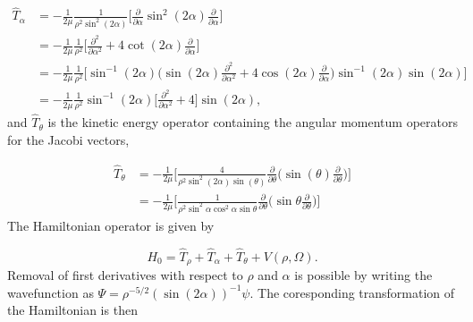 \documentclass{article}
\numberwithin{equation}{section}
\numberwithin{figure}{section}
\begin{document}
\begin{align}
\hat{T}_{\alpha} &= -\frac{1}{2\mu}  \frac{1}{\rho^2 \sin^2(2\alpha)}  \bigg[ \frac{\partial}{\partial\alpha} \sin^2(2\alpha) \frac{\partial}{\partial\alpha} \bigg]\nonumber\\ 
&= -\frac{1}{2\mu} \frac{1}{\rho^2} \bigg[ \frac{\partial^2}{\partial\alpha^2} + 4\cot(2\alpha) \frac{\partial}{\partial\alpha} \bigg]\nonumber\\
&= -\frac{1}{2\mu} \frac{1}{\rho^2} \bigg[ \sin^{-1}(2\alpha) \bigg(\sin(2\alpha)\frac{\partial^2}{\partial\alpha^2} + 4\cos(2\alpha) \frac{\partial}{\partial\alpha} \bigg) \sin^{-1}(2\alpha) \sin(2\alpha) \bigg]\nonumber\\
&= -\frac{1}{2\mu} \frac{1}{\rho^2}\sin^{-1}(2\alpha) \bigg[ \frac{\partial^2}{\partial\alpha^2} + 4 \bigg] \sin(2\alpha),
\end{align} 
and $\hat{T}_{\theta}$ is the kinetic energy operator containing the angular momentum operators for the Jacobi vectors,

\begin{align}                  
\hat{T}_{\theta} &= -\frac{1}{2\mu} \bigg[ \frac{4}{\rho^2 \sin^2(2\alpha)\sin(\theta)} \frac{\partial}{\partial\theta} \bigg( \sin(\theta) \frac{\partial}{\partial\theta} \bigg) \bigg]\nonumber\\ 
                      	&= -\frac{1}{2\mu} \bigg[ \frac{1}{\rho^2 \sin^2\alpha\cos^2\alpha\sin\theta} \frac{\partial}{\partial\theta} \bigg( \sin\theta \frac{\partial}{\partial\theta} \bigg) \bigg]
\end{align}
The Hamiltonian operator is given by

\begin{equation}
H_0 = \hat{T}_{\rho} + \hat{T}_{\alpha} + \hat{T}_{\theta} + V(\rho,\Omega).
\end{equation}                      		
Removal of first derivatives with respect to $\rho$ and $\alpha$ is possible by writing the wavefunction as $\Psi = \rho^{-5/2}(\sin(2\alpha))^{-1}\psi$. The coresponding transformation of the Hamiltonian is then
\end{document}
